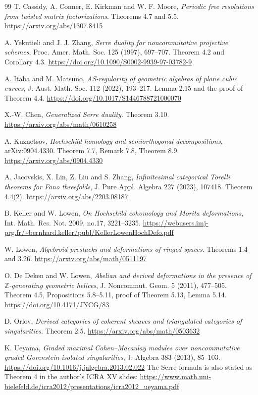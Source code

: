 \documentclass[a4paper,11pt]{ltjsarticle}
\theoremstyle{definition}
\begin{document}
\begin{thebibliography}{99}
T. Cassidy, A. Conner, E. Kirkman and W. F. Moore,
\emph{Periodic free resolutions from twisted matrix factorizations}.
Theorems 4.7 and 5.5.
\url{https://arxiv.org/abs/1307.8415}

A. Yekutieli and J. J. Zhang,
\emph{Serre duality for noncommutative projective schemes},
Proc. Amer. Math. Soc. 125 (1997), 697--707.
Theorem 4.2 and Corollary 4.3.
\url{https://doi.org/10.1090/S0002-9939-97-03782-9}

A. Itaba and M. Matsuno,
\emph{AS-regularity of geometric algebras of plane cubic curves},
J. Aust. Math. Soc. 112 (2022), 193--217.
Lemma 2.15 and the proof of Theorem 4.4.
\url{https://doi.org/10.1017/S1446788721000070}

X.-W. Chen,
\emph{Generalized Serre duality}.
Theorem 3.10.
\url{https://arxiv.org/abs/math/0610258}

A. Kuznetsov,
\emph{Hochschild homology and semiorthogonal decompositions},
arXiv:0904.4330.
Theorem 7.7, Remark 7.8, Theorem 8.9.
\url{https://arxiv.org/abs/0904.4330}

A. Jacovskis, X. Lin, Z. Liu and S. Zhang,
\emph{Infinitesimal categorical Torelli theorems for Fano threefolds},
J. Pure Appl. Algebra 227 (2023), 107418.
Theorem 4.4(2).
\url{https://arxiv.org/abs/2203.08187}

B. Keller and W. Lowen,
\emph{On Hochschild cohomology and Morita deformations},
Int. Math. Res. Not. 2009, no.17, 3221--3235.
\url{https://webusers.imj-prg.fr/~bernhard.keller/publ/KellerLowenHochDefo.pdf}

W. Lowen,
\emph{Algebroid prestacks and deformations of ringed spaces}.
Theorems 1.4 and 3.26.
\url{https://arxiv.org/abs/math/0511197}

O. De Deken and W. Lowen,
\emph{Abelian and derived deformations in the presence of
$\mathbb Z$-generating geometric helices},
J. Noncommut. Geom. 5 (2011), 477--505.
Theorem 4.5, Propositions 5.8--5.11, proof of Theorem 5.13, Lemma 5.14.
\url{https://doi.org/10.4171/JNCG/83}

D. Orlov,
\emph{Derived categories of coherent sheaves and triangulated categories of singularities}.
Theorem 2.5.
\url{https://arxiv.org/abs/math/0503632}

K. Ueyama,
\emph{Graded maximal Cohen--Macaulay modules over noncommutative graded
Gorenstein isolated singularities},
J. Algebra 383 (2013), 85--103.
\url{https://doi.org/10.1016/j.jalgebra.2013.02.022}
The Serre formula is also stated as Theorem 4 in the author's ICRA XV slides:
\url{https://www.math.uni-bielefeld.de/icra2012/presentations/icra2012_ueyama.pdf}


\end{thebibliography}
\end{document}
